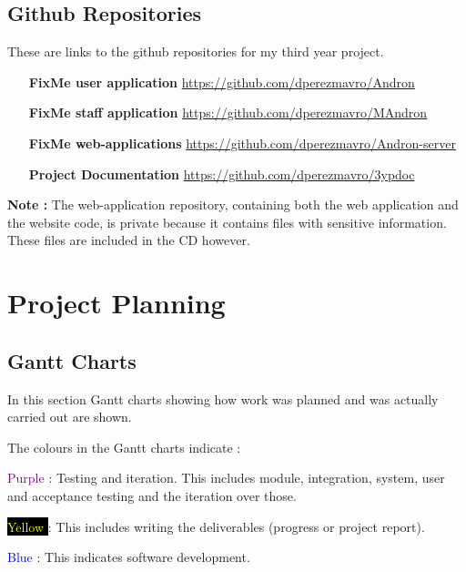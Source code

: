 \documentclass[12pt]{ecsproject}     %
\begin{document}
\section{Github Repositories}
\label{sec:repos}
These are links to the github repositories for my third year project. 
\begin{itemize}
\item[\textbf{FixMe user application}] \href{https://github.com/dperezmavro/Andron}{https://github.com/dperezmavro/Andron}
\item[\textbf{FixMe staff application}] \href{https://github.com/dperezmavro/MAndron}{https://github.com/dperezmavro/MAndron}
\item[\textbf{FixMe web-applications}] \href{https://github.com/dperezmavro/Andron-server}{https://github.com/dperezmavro/Andron-server}
\item[\textbf{Project Documentation}] \href{https://github.com/dperezmavro/3ypdoc}{https://github.com/dperezmavro/3ypdoc}
\end{itemize}

\textbf{Note : }The web-application repository, containing both the web application and the website code, is private because it contains files with sensitive information. These files are included in the CD however.

\chapter{Project Planning}
\section{Gantt Charts}

In this section Gantt charts showing how work was planned and was actually carried out are shown.

The colours in the Gantt charts indicate :

\textcolor{purple}{Purple } : Testing and iteration. This includes module, integration, system, user and acceptance testing and the iteration over those.

\colorbox{black}{\textcolor{yellow}{Yellow }} : This includes writing the deliverables (progress or project report).

\textcolor{blue}{Blue } : This indicates software development.
\end{document}
